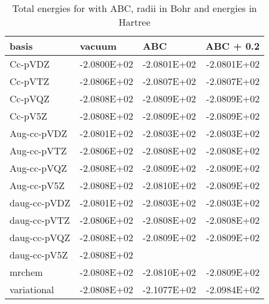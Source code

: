 \documentclass[../master_thesis.tex]{subfiles}
\begin{document}
\begin{table}[htbp]
\caption{Total energies for  with \ac{ABC}, radii in Bohr and energies in Hartree}
\begin{tabular}{|l|r|r|r|}
\hline
basis & \multicolumn{1}{l|}{vacuum} & \multicolumn{1}{l|}{\ac{ABC}} & \multicolumn{1}{l|}{\ac{ABC} + 0.2} \\ \hline
Cc-pVDZ & -2.0800E+02 & -2.0801E+02 & -2.0801E+02 \\ \hline
Cc-pVTZ & -2.0806E+02 & -2.0807E+02 & -2.0807E+02 \\ \hline
Cc-pVQZ & -2.0808E+02 & -2.0809E+02 & -2.0809E+02 \\ \hline
Cc-pV5Z & -2.0808E+02 & -2.0809E+02 & -2.0809E+02 \\ \hline
Aug-cc-pVDZ & -2.0801E+02 & -2.0803E+02 & -2.0803E+02 \\ \hline
Aug-cc-pVTZ & -2.0806E+02 & -2.0808E+02 & -2.0808E+02 \\ \hline
Aug-cc-pVQZ & -2.0808E+02 & -2.0809E+02 & -2.0809E+02 \\ \hline
Aug-cc-pV5Z & -2.0808E+02 & -2.0810E+02 & -2.0809E+02 \\ \hline
daug-cc-pVDZ & -2.0801E+02 & -2.0803E+02 & -2.0803E+02 \\ \hline
daug-cc-pVTZ & -2.0806E+02 & -2.0808E+02 & -2.0808E+02 \\ \hline
daug-cc-pVQZ & -2.0808E+02 & -2.0809E+02 & -2.0809E+02 \\ \hline
daug-cc-pV5Z & -2.0808E+02 & \multicolumn{1}{l|}{} & \multicolumn{1}{l|}{} \\ \hline
mrchem & -2.0808E+02 & -2.0810E+02 & -2.0809E+02 \\ \hline
variational & -2.0808E+02 & -2.1077E+02 & -2.0984E+02 \\ \hline
\end{tabular}
\label{tab:acetamidrawdataabc}
\end{table}
\end{document}
